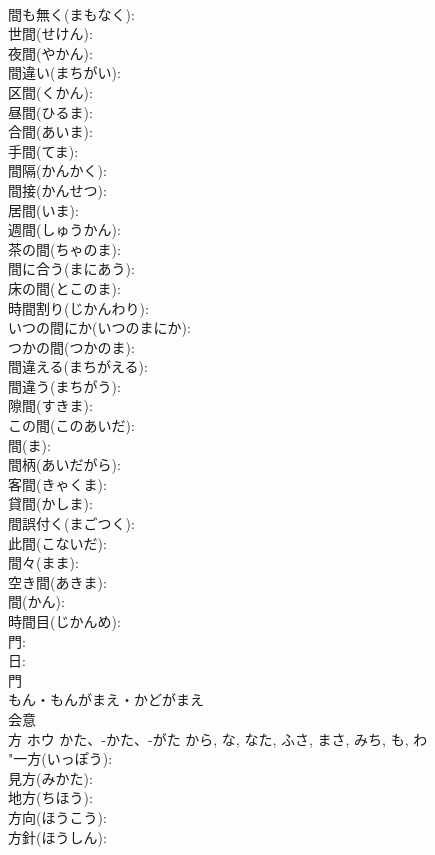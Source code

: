 \documentclass[8pt]{extreport}
\begin{document}
\begin{CJK}{UTF8}{min}
\\	間も無く(まもなく): 
\\	世間(せけん): 
\\	夜間(やかん): 
\\	間違い(まちがい): 
\\	区間(くかん): 
\\	昼間(ひるま): 
\\	合間(あいま): 
\\	手間(てま): 
\\	間隔(かんかく): 
\\	間接(かんせつ): 
\\	居間(いま): 
\\	週間(しゅうかん): 
\\	茶の間(ちゃのま): 
\\	間に合う(まにあう): 
\\	床の間(とこのま): 
\\	時間割り(じかんわり): 
\\	いつの間にか(いつのまにか): 
\\	つかの間(つかのま): 
\\	間違える(まちがえる): 
\\	間違う(まちがう): 
\\	隙間(すきま): 
\\	この間(このあいだ): 
\\	間(ま): 
\\	間柄(あいだがら): 
\\	客間(きゃくま): 
\\	貸間(かしま): 
\\	間誤付く(まごつく): 
\\	此間(こないだ): 
\\	間々(まま): 
\\	空き間(あきま): 
\\	間(かん): 
\\	時間目(じかんめ): 
\\	門: 
\\	日: 
\\	門	
\\	もん・もんがまえ・かどがまえ	
\\	会意 
\\	方	ホウ	かた、-かた、-がた	から, な, なた, ふさ, まさ, みち, も, わ	
\\	"一方(いっぽう): 
\\	見方(みかた): 
\\	地方(ちほう): 
\\	方向(ほうこう): 
\\	方針(ほうしん): 

\end{CJK}
\end{document}

